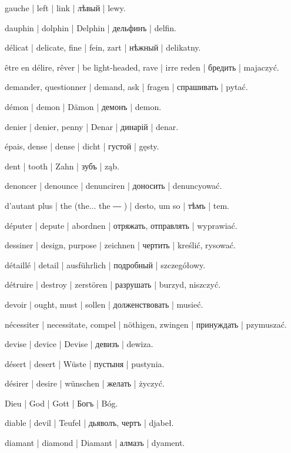 \begin{outdent}{1em}
\uvsubentry{}
gauche | left | link | лѣвый | lewy.

dauphin | dolphin | Delphin | дельфинъ | delfin.

délicat | delicate, fine | fein, zart | нѣжный | delikatny.

être en délire, rêver | be light-headed, rave | irre reden | бредить | majaczyć.

demander, questionner | demand, ask | fragen | спрашивать | pytać.

démon | demon | Dämon | демонъ | demon.

denier | denier, penny | Denar | динарій | denar.

épais, dense | dense | dicht | густой | gęsty.

dent | tooth | Zahn | зубъ | ząb.

denoncer | denounce | denunciren | доносить | denuncyować.

d’autant plus | the (the... the ― ) | desto, um so | тѣмъ | tem.

députer | depute | abordnen | отряжать, отправлять | wyprawiać.

dessiner | design, purpose | zeichnen | чертить | kreślić, rysować.

détaillé | detail | ausführlich | подробный | szczegółowy.

détruire | destroy | zerstören | разрушать | burzyd,
niszczyć.

devoir | ought, must | sollen | долженствовать | musieć.

\uvsubentry{}
nécessiter | necessitate, compel | nöthigen, zwingen | принуждать | pzymuszać.

devise | device | Devise | девизъ | dewiza.

désert | desert | Wüste | пустыня | pustynia.

désirer | desire | wünschen | желать | życzyć.

Dieu | God | Gott | Богъ | Bóg.

diable | devil | Teufel | дьяволъ, чертъ | djabeł.

diamant | diamond | Diamant | алмазъ | dyament.


\end{outdent}

